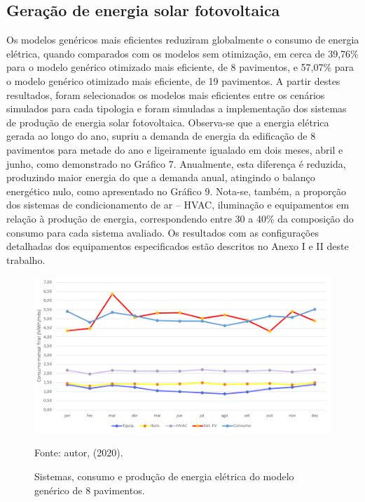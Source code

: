 \subsection{Geração de energia solar fotovoltaica}
\noindent Os modelos genéricos mais eficientes reduziram globalmente o consumo de energia elétrica, quando comparados com os modelos sem otimização, em cerca de 39,76\% para o modelo genérico otimizado mais eficiente, de 8 pavimentos, e 57,07\% para o modelo genérico otimizado mais eficiente, de 19 pavimentos. A partir destes resultados, foram selecionados os modelos mais eficientes entre os cenários simulados para cada tipologia e foram simuladas a implementação dos sistemas de produção de energia solar fotovoltaica.\vspace*{0.3cm} \newline
\noindent Observa-se que a energia elétrica gerada ao longo do ano, supriu a demanda de energia da edificação de 8 pavimentos para metade do ano e ligeiramente igualado em dois meses, abril e junho, como demonstrado no Gráfico 7. Anualmente, esta diferença é reduzida, produzindo maior energia do que a demanda anual, atingindo o balanço energético nulo, como apresentado no Gráfico 9. Nota-se, também, a proporção dos sistemas de condicionamento de ar – HVAC, iluminação e equipamentos em relação à produção de energia, correspondendo entre 30 a 40\% da composição do consumo para cada sistema avaliado. Os resultados com as configurações detalhadas dos equipamentos especificados estão descritos no Anexo I e II deste trabalho.
\begin{figure}[H]
    \centering
    \caption{Sistemas, consumo e produção de energia elétrica do modelo genérico de 8 pavimentos.}
    \includegraphics[width=1.0\textwidth]{figures/result/fig41-consumomod.png}
    \begin{flushleft}
        \par \small Fonte: autor, (2020).
    \end{flushleft}
    \label{fig:figure29}
\end{figure}
